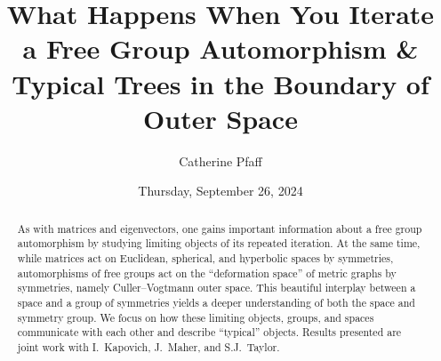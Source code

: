 \documentclass{UAmathtalk}
\author{Catherine Pfaff}
\title{What Happens When You Iterate a Free Group Automorphism \& Typical Trees in the Boundary of Outer Space}
\date{Thursday, September 26, 2024}
\begin{document}
\maketitle

\begin{abstract}
As with matrices and eigenvectors, one gains important information about a free group automorphism by studying limiting objects of its repeated iteration. At the same time, while matrices act on Euclidean, spherical, and hyperbolic spaces by symmetries, automorphisms of free groups act on the “deformation space” of metric graphs by symmetries, namely Culler--Vogtmann outer space. This beautiful interplay between a space and a group of symmetries yields a deeper understanding of both the space and symmetry group. We focus on how these limiting objects, groups, and spaces communicate with each other and describe “typical” objects. Results presented are joint work with I.~Kapovich, J.~Maher, and S.J.~Taylor.
\end{abstract}
\end{document}
